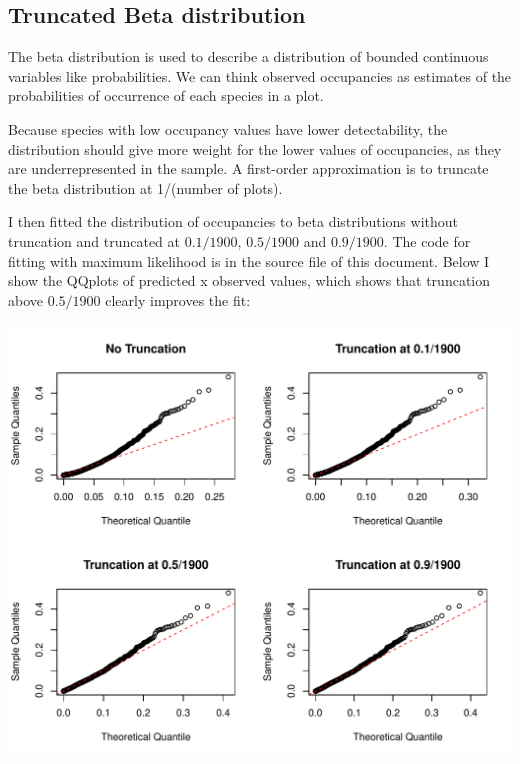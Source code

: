 \documentclass[12pt, A4]{article}\usepackage[]{graphicx}\usepackage[]{color}
\makeatletter
\def\maxwidth{ %
  \ifdim\Gin@nat@width>\linewidth
    \linewidth
  \else
    \Gin@nat@width
  \fi
}
\newenvironment{knitrout}{}{} %
\makeatother
\begin{document}
\subsection*{Truncated Beta distribution}

The beta distribution is used to describe a distribution of bounded
continuous variables like probabilities. We can think observed
occupancies as estimates of the probabilities of occurrence of each species
in a plot. 

Because species with low occupancy values have lower detectability,
the distribution should give more weight for the lower values of occupancies,
as they are underrepresented in the sample. 
A first-order approximation is to truncate the
beta distribution at 1/(number of plots). 

I then fitted the distribution of occupancies to beta distributions
without truncation and truncated at $0.1/1900$, $0.5/1900$ and $0.9/1900$.
The code for fitting with maximum likelihood
is in the source file of this document.  
Below I show the QQplots of predicted x observed values,
which shows that truncation above $0.5/1900$ clearly
improves the fit:



\begin{knitrout}
\color{fgcolor}

{\centering \includegraphics[width=\maxwidth]{figure/beta_qqplots-1} 

}



\end{knitrout}
\end{document}
